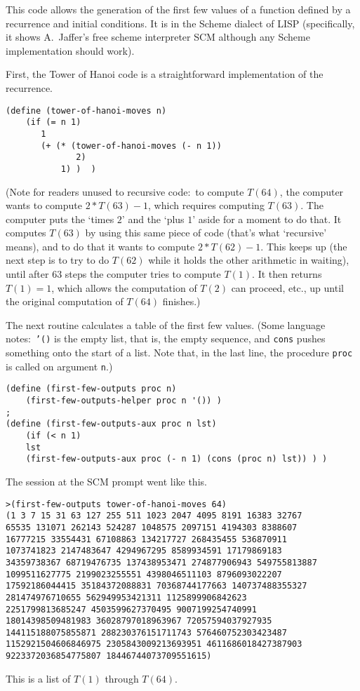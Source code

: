 \announcecomputercode
This code allows the generation of the first few values of a function 
defined by a recurrence and initial conditions.
It is in the Scheme dialect of LISP
(specifically, it shows A.~Jaffer's free scheme interpreter SCM 
although any Scheme implementation should work).

First,
the Tower of Hanoi code is a straightforward implementation of the recurrence.
\begin{lstlisting}
(define (tower-of-hanoi-moves n) 
    (if (= n 1)
       1
       (+ (* (tower-of-hanoi-moves (- n 1)) 
              2) 
           1) )  )
\end{lstlisting}
\noindent (Note for readers unused to recursive code:~to compute $T(64)$, 
the computer wants to compute $2*T(63)-1$, which requires
computing $T(63)$.
The computer puts the `times $2$' and the `plus $1$' aside for a moment
to do that.
It computes  $T(63)$ by using this same piece of code (that's 
what `recursive' means), and to do that it wants to compute $2*T(62)-1$.
This keeps up (the next step is to try to do $T(62)$ while it holds the other 
arithmetic in waiting), until after $63$ steps the computer
tries to compute $T(1)$.
It then returns $T(1)=1$, 
which allows the computation of $T(2)$ can proceed,
etc., up until the original computation of $T(64)$ finishes.)

The next routine calculates a table of the first few 
values.
(Some language notes:~\texttt{'()} is the empty list, that is, 
the empty sequence, and \texttt{cons} pushes something onto the start of a 
list.
Note that, in the last line, the procedure \texttt{proc}
is called on argument \texttt{n}.)
\begin{lstlisting}
(define (first-few-outputs proc n)
    (first-few-outputs-helper proc n '()) )
;
(define (first-few-outputs-aux proc n lst)
    (if (< n 1)
    lst 
    (first-few-outputs-aux proc (- n 1) (cons (proc n) lst)) ) )
\end{lstlisting}
\noindent The session at the SCM prompt went like this.
\begin{lstlisting}
>(first-few-outputs tower-of-hanoi-moves 64)
(1 3 7 15 31 63 127 255 511 1023 2047 4095 8191 16383 32767 
65535 131071 262143 524287 1048575 2097151 4194303 8388607 
16777215 33554431 67108863 134217727 268435455 536870911 
1073741823 2147483647 4294967295 8589934591 17179869183 
34359738367 68719476735 137438953471 274877906943 549755813887 
1099511627775 2199023255551 4398046511103 8796093022207 
17592186044415 35184372088831 70368744177663 140737488355327 
281474976710655 562949953421311 1125899906842623 
2251799813685247 4503599627370495 9007199254740991 
18014398509481983 36028797018963967 72057594037927935 
144115188075855871 288230376151711743 576460752303423487 
1152921504606846975 2305843009213693951 4611686018427387903 
9223372036854775807 18446744073709551615)
\end{lstlisting}
\noindent This is a list of $T(1)$ through $T(64)$.
\endinput

